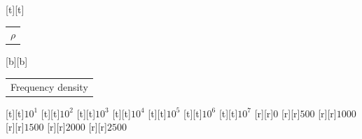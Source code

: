 %    
%
%
\begin{psfrags}%
\psfragscanon%
%
[t][t]{\color[rgb]{0,0,0}\setlength{\tabcolsep}{0pt}\begin{tabular}{c}{\Large$\rho$}\end{tabular}}%
[b][b]{\color[rgb]{0,0,0}\setlength{\tabcolsep}{0pt}\begin{tabular}{c}{\Large Frequency density}\end{tabular}}%
%
[t][t]{$10^1$}%
[t][t]{$10^2$}%
[t][t]{$10^3$}%
[t][t]{$10^4$}%
[t][t]{$10^5$}%
[t][t]{$10^6$}%
[t][t]{$10^7$}%
%
[r][r]{$0$}%
[r][r]{$500$}%
[r][r]{$1000$}%
[r][r]{$1500$}%
[r][r]{$2000$}%
[r][r]{$2500$}%
%
%
\end{psfrags}%
%
